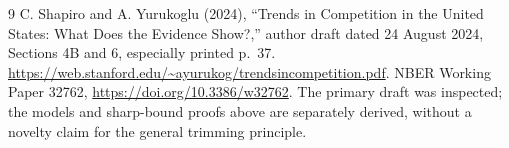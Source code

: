 \documentclass[11pt,a4paper]{article}
\theoremstyle{definition}
\theoremstyle{remark}
\begin{document}
\begin{thebibliography}{9}
 C. Shapiro and A. Yurukoglu (2024), ``Trends in Competition in the United States: What Does the Evidence Show?,'' author draft dated 24 August 2024, Sections 4B and 6, especially printed p.~37. \url{https://web.stanford.edu/~ayurukog/trendsincompetition.pdf}. NBER Working Paper 32762, \url{https://doi.org/10.3386/w32762}. The primary draft was inspected; the models and sharp-bound proofs above are separately derived, without a novelty claim for the general trimming principle.
\end{thebibliography}
\end{document}

